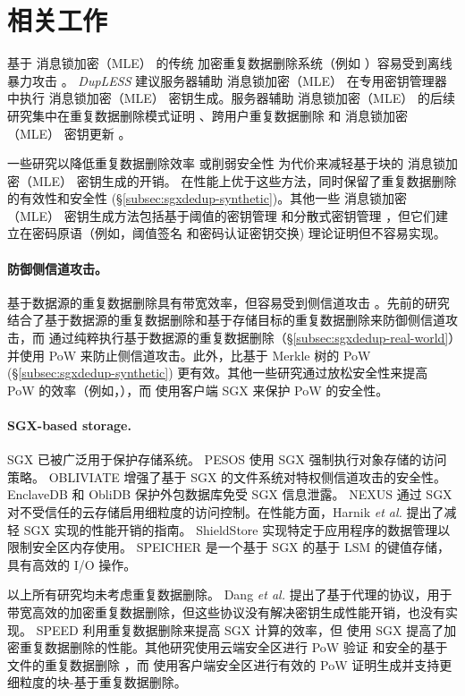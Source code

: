 \section{相关工作}
\label{sec:sgxdedup-related_work}

 基于 消息锁加密（MLE） 的传统 \cite{bellare13a} 加密重复数据删除系统（例如 \cite{adya02,cox02,shah15}）容易受到离线暴力攻击 \cite{bellare13b}。 {\em DupLESS} \cite{bellare13b} 建议服务器辅助 消息锁加密（MLE） 在专用密钥管理器中执行 消息锁加密（MLE） 密钥生成。服务器辅助 消息锁加密（MLE） 的后续研究集中在重复数据删除模式证明 \cite{armknecht15}、跨用户重复数据删除 \cite{zhou15} 和 消息锁加密（MLE） 密钥更新 \cite{qin17}。

一些研究以降低重复数据删除效率 \cite{zhou15,qin17} 或削弱安全性 \cite{li20a} 为代价来减轻基于块的 消息锁加密（MLE） 密钥生成的开销。 \sysnameS 在性能上优于这些方法，同时保留了重复数据删除的有效性和安全性 (\S\ref{subsec:sgxdedup-synthetic})。其他一些 消息锁加密（MLE） 密钥生成方法包括基于阈值的密钥管理 \cite{duan14} 和分散式密钥管理 \cite{liu15}，但它们建立在密码原语（例如，阈值签名 \cite{duan14} 和密码认证密钥交换\cite{liu15}) 理论证明但不容易实现。

\paragraph*{防御侧信道攻击。} 基于数据源的重复数据删除具有带宽效率，但容易受到侧信道攻击 \cite{harnik10}。先前的研究 \cite{harnik10, li15} 结合了基于数据源的重复数据删除和基于存储目标的重复数据删除来防御侧信道攻击，而 \sysnameS 通过纯粹执行基于数据源的重复数据删除（\S\ref{subsec:sgxdedup-real-world}）并使用 PoW 来防止侧信道攻击。此外，\sysnameS 比基于 Merkle 树的 PoW (\S\ref{subsec:sgxdedup-synthetic}) 更有效。其他一些研究通过放松安全性来提高 PoW 的效率（例如，\cite{pietro12,xu13}），而 \sysnameS 使用客户端 SGX 来保护 PoW 的安全性。

\paragraph*{SGX-based storage.} SGX \cite{sgx} 已被广泛用于保护存储系统。 PESOS \cite{krahn18} 使用 SGX 强制执行对象存储的访问策略。 OBLIVIATE \cite{ahmad18} 增强了基于 SGX 的文件系统对特权侧信道攻击的安全性。 EnclaveDB \cite{priebe18} 和 ObliDB \cite{eskandarian19} 保护外包数据库免受 SGX 信息泄露。 NEXUS \cite{djoko19} 通过 SGX 对不受信任的云存储启用细粒度的访问控制。在性能方面，Harnik \textit{ et al.} \cite{harnik18} 提出了减轻 SGX 实现的性能开销的指南。 ShieldStore \cite{kim19} 实现特定于应用程序的数据管理以限制安全区内存使用。 SPEICHER \cite{bailleu19} 是一个基于 SGX 的基于 LSM 的键值存储，具有高效的 I/O 操作。

以上所有研究均未考虑重复数据删除。 Dang \textit{ et al.} \cite{dang17} 提出了基于代理的协议，用于带宽高效的加密重复数据删除，但这些协议没有解决密钥生成性能开销，也没有实现。 SPEED \cite{cui19} 利用重复数据删除来提高 SGX 计算的效率，但 \sysnameS 使用 SGX 提高了加密重复数据删除的性能。其他研究使用云端安全区进行 PoW 验证 \cite{you20} 和安全的基于文件的重复数据删除 \cite{fuhry20}，而 \sysnameS 使用客户端安全区进行有效的 PoW 证明生成并支持更细粒度的块-基于重复数据删除。
